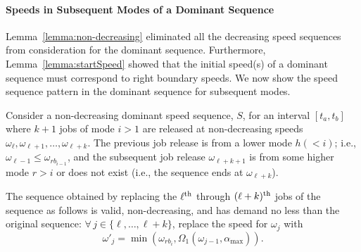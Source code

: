 \paragraph{Speeds in Subsequent Modes of a Dominant Sequence}

Lemma~\ref{lemma:non-decreasing} eliminated all the decreasing speed sequences from consideration for the dominant sequence. 
Furthermore, Lemma~\ref{lemma:startSpeed} showed that the initial speed(s) of a dominant sequence must correspond to right boundary speeds. We now show the speed sequence pattern in the dominant sequence for subsequent modes.  

\begin{lemma}\label{lem:speedsbtwRB}
Consider a non-decreasing dominant speed sequence, $S$, for an interval $[t_a, t_b]$ where $k+1$ jobs of mode $i>1$ are released at non-decreasing speeds $\omega_\ell, \omega_{\ell + 1}, \ldots,  \omega_{\ell + k}$. The previous job release is from a lower mode $h (< i)$; i.e., $\omega_{\ell-1} \leq \omega_{rb_{i-1}}$, and the subsequent job release $\omega_{\ell+k+1}$ is from some higher mode $r > i$ or does not exist (i.e., the sequence ends at $\omega_{\ell + k}$).  

The sequence obtained by replacing the $\ell^{\rm th}$ through $(\ell + k)^{\rm th}$ jobs of the sequence as follows is valid, non-decreasing, and has demand no less than the original sequence:  $\forall \, j\in\{\ell, \ldots, \ell + k\}$, replace the speed for $\omega_j$ with
\begin{equation}\label{eqn:replace-speed}
    \omega'_j = \min(\omega_{rb_i}, \Omega_1(\omega_{j-1},\alpha_{\max})).
\end{equation}

\end{lemma}
